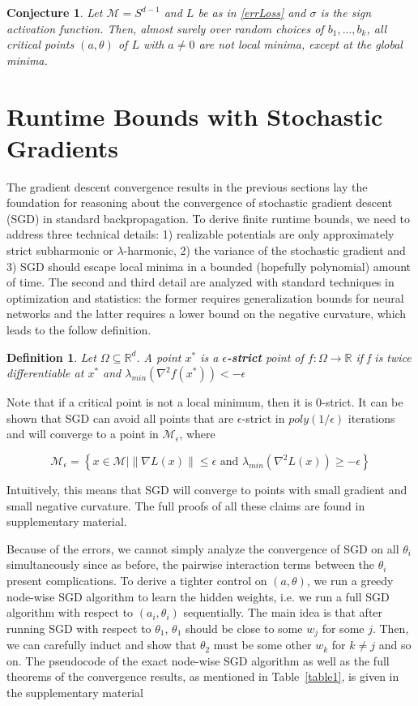 \documentclass{article}
\newtheorem{conjecture}[theorem]{Conjecture}
\newtheorem{definition}[theorem]{Definition}
\newcommand{\R}{{\mathbb{R}}}
\begin{document}
\begin{conjecture}
 Let $\mathcal{M} = S^{d-1}$ and $L$ be as in \eqref{errLoss} and $\sigma$ is the sign activation function. Then, almost surely over random choices of $b_1,...,b_k$, all critical points $(a,\theta)$ of $L$ with $a \neq 0$ are not local minima, except at the global minima. 
\end{conjecture}


\section{Runtime Bounds with Stochastic Gradients}

The gradient descent convergence results in the previous sections lay the foundation for reasoning about the convergence of stochastic gradient descent (SGD) in standard backpropagation. To derive finite runtime bounds, we need to address three technical details: 1) realizable potentials are only approximately strict subharmonic or $\lambda$-harmonic, 2) the variance of the stochastic gradient and 3) SGD should escape local minima in a bounded (hopefully polynomial) amount of time. The second and third detail are analyzed with standard techniques in optimization and statistics: the former requires generalization bounds for neural networks and the latter requires a lower bound on the negative curvature, which leads to the follow definition.

\begin{definition} Let $\Omega \subseteq \R^d$. A point $x^*$ is a {\bf $\epsilon$-strict} point of $f : \Omega \to \R$ if f is twice differentiable at $x^*$ and $\lambda_{min}(\nabla^2f(x^*)) < -\epsilon$
\end{definition}

Note that if a critical point is not a local minimum, then it is $0$-strict. It can be shown that SGD can avoid all points that are $\epsilon$-strict in $poly(1/\epsilon)$ iterations and will converge to a point in $\mathcal{M}_\epsilon$, where

\[\mathcal{M}_\epsilon = \left\{x\in \mathcal{M} \Big| \|\nabla L(x)\| \leq \epsilon \text{ and } \lambda_{min}(\nabla^2 L(x)) \geq -\epsilon\right\}\]

Intuitively, this means that SGD will converge to points with small gradient and small negative curvature. The full proofs of all these claims are found in supplementary material. 

Because of the errors, we cannot simply analyze the convergence of SGD on all $\theta_i$ simultaneously since as before, the pairwise interaction terms between the $\theta_i$ present complications. To derive a tighter control on $(a,\theta)$, we run a greedy node-wise SGD algorithm to learn the hidden weights, i.e. we run a full SGD algorithm with respect to $(a_i,\theta_i)$ sequentially. The main idea is that after running SGD with respect to $\theta_1$, $\theta_1$ should be close to some $w_j$ for some $j$. Then, we can carefully induct and show that $\theta_2$ must be some other $w_k$ for $k\neq j$ and so on. The pseudocode of the exact node-wise SGD algorithm as well as the full theorems of the convergence results, as mentioned in Table~\ref{table1}, is given in the supplementary material
\end{document}
